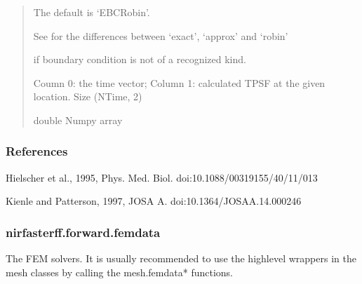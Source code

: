 \documentclass[letterpaper,10pt,english]{sphinxmanual}
\begin{document}
\begin{fulllineitems}
\begin{quote}
\begin{description}
\begin{itemize}
\sphinxAtStartPar
The default is ‘EBC\sphinxhyphen{}Robin’.

\sphinxAtStartPar
See {\hyperref[\detokenize{_autosummary/nirfasterff.utils.boundary_attenuation:nirfasterff.utils.boundary_attenuation}]{}} for the differences between ‘exact’, ‘approx’ and ‘robin’


\end{itemize}

\sphinxAtStartPar
{} \textendash{} if boundary condition is not of a recognized kind.

\sphinxAtStartPar
{} \textendash{} Coumn 0: the time vector; Column 1: calculated TPSF at the given location. Size (NTime, 2)

\sphinxAtStartPar
double Numpy array

\end{description}\end{quote}
\subsubsection*{References}

\sphinxAtStartPar
Hielscher et al., 1995, Phys. Med. Biol. doi:10.1088/0031\sphinxhyphen{}9155/40/11/013

\sphinxAtStartPar
Kienle and Patterson, 1997, JOSA A. doi:10.1364/JOSAA.14.000246

\end{fulllineitems}


\sphinxstepscope


\subsubsection{nirfasterff.forward.femdata}
\label{\detokenize{_autosummary/nirfasterff.forward.femdata:module-nirfasterff.forward.femdata}}\label{\detokenize{_autosummary/nirfasterff.forward.femdata:nirfasterff-forward-femdata}}\label{\detokenize{_autosummary/nirfasterff.forward.femdata::doc}}
\sphinxAtStartPar
The FEM solvers. It is usually recommended to use the high\sphinxhyphen{}level wrappers in the mesh classes by calling the mesh.femdata* functions.
\end{document}
